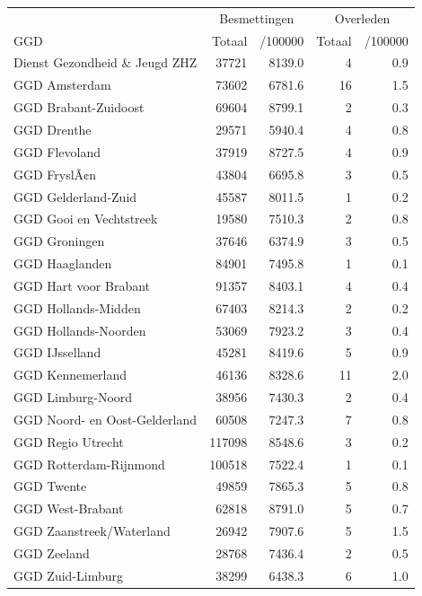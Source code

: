\documentclass[
  english,
  man,floatsintext]{apa6}
\begin{document}
\begin{table}
\centering\begingroup\fontsize{10}{12}\selectfont

\begin{threeparttable}
\begin{tabular}{lrrrr}
\toprule
\multicolumn{1}{c}{ } & \multicolumn{2}{c}{Besmettingen} & \multicolumn{2}{c}{Overleden} \\
\cmidrule(l{3pt}r{3pt}){2-3} \cmidrule(l{3pt}r{3pt}){4-5}
GGD & Totaal & /100000 & Totaal & /100000\\
\midrule
Dienst Gezondheid \& Jeugd ZHZ & 37721 & 8139.0 & 4 & 0.9\\
GGD Amsterdam & 73602 & 6781.6 & 16 & 1.5\\
GGD Brabant-Zuidoost & 69604 & 8799.1 & 2 & 0.3\\
GGD Drenthe & 29571 & 5940.4 & 4 & 0.8\\
GGD Flevoland & 37919 & 8727.5 & 4 & 0.9\\
GGD FryslÃ¢n & 43804 & 6695.8 & 3 & 0.5\\
GGD Gelderland-Zuid & 45587 & 8011.5 & 1 & 0.2\\
GGD Gooi en Vechtstreek & 19580 & 7510.3 & 2 & 0.8\\
GGD Groningen & 37646 & 6374.9 & 3 & 0.5\\
GGD Haaglanden & 84901 & 7495.8 & 1 & 0.1\\
GGD Hart voor Brabant & 91357 & 8403.1 & 4 & 0.4\\
GGD Hollands-Midden & 67403 & 8214.3 & 2 & 0.2\\
GGD Hollands-Noorden & 53069 & 7923.2 & 3 & 0.4\\
GGD IJsselland & 45281 & 8419.6 & 5 & 0.9\\
GGD Kennemerland & 46136 & 8328.6 & 11 & 2.0\\
GGD Limburg-Noord & 38956 & 7430.3 & 2 & 0.4\\
GGD Noord- en Oost-Gelderland & 60508 & 7247.3 & 7 & 0.8\\
GGD Regio Utrecht & 117098 & 8548.6 & 3 & 0.2\\
GGD Rotterdam-Rijnmond & 100518 & 7522.4 & 1 & 0.1\\
GGD Twente & 49859 & 7865.3 & 5 & 0.8\\
GGD West-Brabant & 62818 & 8791.0 & 5 & 0.7\\
GGD Zaanstreek/Waterland & 26942 & 7907.6 & 5 & 1.5\\
GGD Zeeland & 28768 & 7436.4 & 2 & 0.5\\
GGD Zuid-Limburg & 38299 & 6438.3 & 6 & 1.0\\

\end{tabular}
\end{threeparttable}
\end{table}
\end{document}
